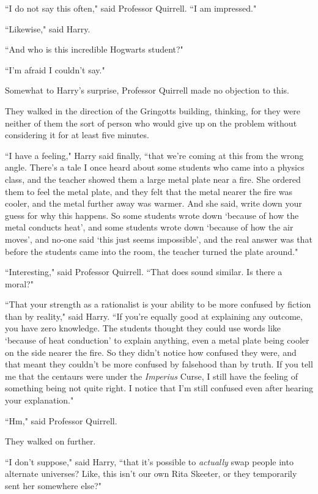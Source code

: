 ``I do not say this often," said Professor Quirrell. ``I am impressed."

``Likewise," said Harry.

``And who is this incredible Hogwarts student?"

``I'm afraid I couldn't say."

Somewhat to Harry's surprise, Professor Quirrell made no objection to this.

They walked in the direction of the Gringotts building, thinking, for they were neither of them the sort of person who would give up on the problem without considering it for at least five minutes.

``I have a feeling," Harry said finally, ``that we're coming at this from the wrong angle. There's a tale I once heard about some students who came into a physics class, and the teacher showed them a large metal plate near a fire. She ordered them to feel the metal plate, and they felt that the metal nearer the fire was cooler, and the metal further away was warmer. And she said, write down your guess for why this happens. So some students wrote down `because of how the metal conducts heat', and some students wrote down `because of how the air moves', and no-one said `this just seems impossible', and the real answer was that before the students came into the room, the teacher turned the plate around."

``Interesting," said Professor Quirrell. ``That does sound similar. Is there a moral?"

``That your strength as a rationalist is your ability to be more confused by fiction than by reality," said Harry. ``If you're equally good at explaining any outcome, you have zero knowledge. The students thought they could use words like `because of heat conduction' to explain anything, even a metal plate being cooler on the side nearer the fire. So they didn't notice how confused they were, and that meant they couldn't be more confused by falsehood than by truth. If you tell me that the centaurs were under the \emph{Imperius} Curse, I still have the feeling of something being not quite right. I notice that I'm still confused even after hearing your explanation."

``Hm," said Professor Quirrell.

They walked on further.

``I don't suppose," said Harry, ``that it's possible to \emph{actually} swap people into alternate universes? Like, this isn't our own Rita Skeeter, or they temporarily sent her somewhere else?"

